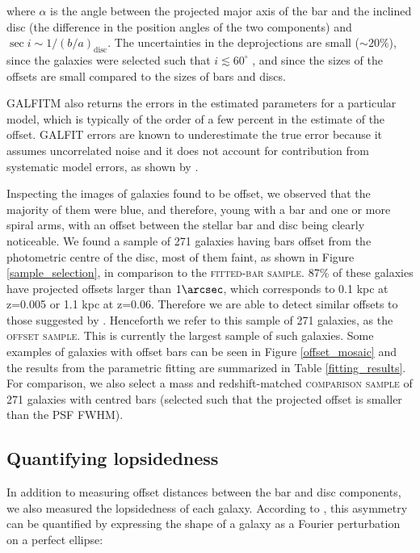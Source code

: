 \documentclass[a4paper,fleqn,usenatbib,useAMS]{mnras}
\begin{document}
\noindent where $\alpha$ is the angle between the projected major axis of the bar and the inclined disc (the difference in the position angles of the two components) and $\sec{i} \sim 1/(b/a)_{\mathrm{disc}}$. The uncertainties in the deprojections are small ($\sim$$20\%$), since the galaxies were selected such that $i\lesssim 60^{\circ}$ \citep{Zou2014}, and since the sizes of the offsets are small compared to the sizes of bars and discs.

GALFITM also returns the errors in the estimated parameters for a particular model, which is typically of the order of a few percent in the estimate of the offset. GALFIT errors are known to underestimate the true error because it assumes uncorrelated noise and it does not account for contribution from systematic model errors, as shown by \citet{Haeussler2007}. 

Inspecting the images of galaxies found to be offset, we observed that the majority of them were blue, and therefore, young with a bar and one or more spiral arms, with an offset between the stellar bar and disc being clearly noticeable. We found a sample of 271 galaxies having bars offset from the photometric centre of the disc, most of them faint, as shown in Figure \ref{sample_selection}, in comparison to the \textsc{fitted-bar sample}. 87\% of these galaxies have projected offsets larger than $1\arcsec$, which corresponds to 0.1 kpc at z=0.005 or 1.1 kpc at z=0.06.  Therefore we are able to detect similar offsets to those suggested by \citet{Pardy2016}. Henceforth we refer to this sample of 271 galaxies, as the \textsc{offset sample}. This is currently the largest sample of such galaxies. Some examples of galaxies with offset bars can be seen in Figure \ref{offset_mosaic} and the results from the parametric fitting are summarized in Table \ref{fitting_results}. For comparison, we also select a mass and redshift-matched \textsc{comparison sample} of 271 galaxies with centred bars (selected such that the projected offset is smaller than the PSF FWHM).


\subsection{Quantifying lopsidedness}

In addition to measuring offset distances between the bar and disc components, we also measured the lopsidedness of each galaxy. According to \citet{Peng2010}, this asymmetry can be quantified by expressing the shape of a galaxy as a Fourier perturbation on a perfect ellipse:
\end{document}
